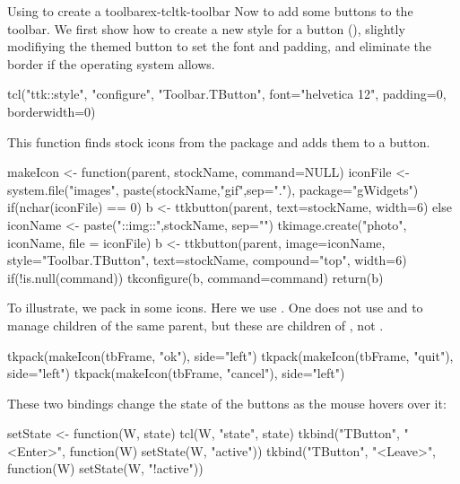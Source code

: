 \begin{example}{Using  to create a toolbar}{ex-tcltk-toolbar}
Now to add some buttons to the toolbar. We first show how to create a
new style for a button (), slightly modifiying the themed button to set
the font and padding, and eliminate the border if the operating system allows. 
\begin{Schunk}
\begin{Sinput}
 tcl("ttk::style", "configure", "Toolbar.TButton", 
     font="helvetica 12", padding=0, borderwidth=0)
\end{Sinput}
\end{Schunk}
This
 function finds stock icons from the 
package and adds them to a button.
\begin{Schunk}
\begin{Sinput}
 makeIcon <- function(parent, stockName, command=NULL) {
   iconFile <- system.file("images", 
                           paste(stockName,"gif",sep="."), 
                           package="gWidgets")
   if(nchar(iconFile) == 0) {
     b <- ttkbutton(parent, text=stockName, width=6)
   } else {
     iconName <- paste("::img::",stockName, sep="")
     tkimage.create("photo", iconName, file = iconFile)
     b <- ttkbutton(parent, image=iconName, 
                    style="Toolbar.TButton", text=stockName, 
                    compound="top", width=6)
     if(!is.null(command))
       tkconfigure(b, command=command)
   }
   return(b)
 }
\end{Sinput}
\end{Schunk}

To illustrate, we pack in some icons. Here we use .  
One does not use  and  to manage
children of the same parent, but these are children of ,
not .
\begin{Schunk}
\begin{Sinput}
 tkpack(makeIcon(tbFrame, "ok"), side="left")
 tkpack(makeIcon(tbFrame, "quit"), side="left")
 tkpack(makeIcon(tbFrame, "cancel"), side="left")
\end{Sinput}
\end{Schunk}

These two bindings change the state of the buttons as the mouse hovers
over it:

\begin{Schunk}
\begin{Sinput}
 setState <- function(W, state) tcl(W, "state", state)
 tkbind("TButton", "<Enter>", function(W) setState(W, "active"))
 tkbind("TButton", "<Leave>", function(W) setState(W, "!active"))
\end{Sinput}
\end{Schunk}

\end{example}

